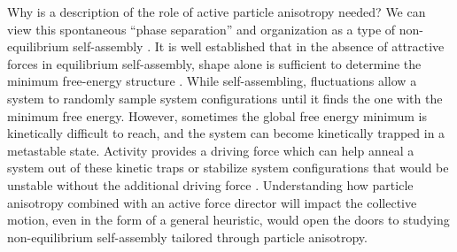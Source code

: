 Why is a description of the role of active particle anisotropy needed?
We can view this spontaneous ``phase separation'' and organization as a type of non-equilibrium self-assembly \cite{Mann_2009_NatureMaterials}.
It is well established that in the absence of attractive forces in equilibrium self-assembly, shape alone is sufficient to determine the minimum free-energy structure \cite{Onsager_1949_ANYAS,Damasceno_2012_Science,Manoharan_2015_Science,vanAndersEA_2014_PNAS}. 
While self-assembling, fluctuations allow a system to randomly sample system configurations until it finds the one with the minimum free energy.
However, sometimes the global free energy minimum is kinetically difficult to reach, and the system can become kinetically trapped in a metastable state.
Activity provides a driving force which can help anneal a system out of these kinetic traps \cite{VanDerMeerDijkstraFilion_2016_SoftMatter,Mallory_2016_PRE} or stabilize system configurations that would be unstable without the additional driving force \cite{ZhangYanEA_2016_AngewandteChemie}. 
Understanding how particle anisotropy combined with an active force director will impact the collective motion, even in the form of a general heuristic, would open the doors to studying non-equilibrium self-assembly tailored through particle anisotropy. 


